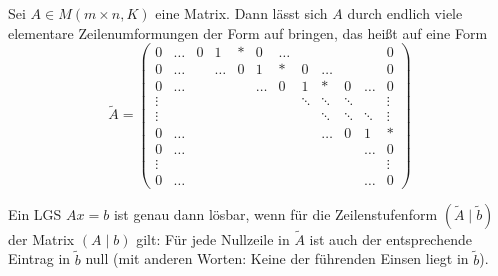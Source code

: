\setcounter{MaxMatrixCols}{20}
\setcounter{definition}{10}
\begin{satz}
	\label{satz:I.3.11}
	Sei $A \in M(m\times n,K)$ eine Matrix.
	Dann lässt sich $A$ durch endlich viele elementare Zeilenumformungen der Form auf  bringen, das heißt auf eine Form
	\[
		\tilde{A} = 
		\begin{pmatrix}
		0 & \dots & 0 & 1 & * & 0 & \dots &  &  &  &  & 0 \\ 
		0 & \dots &  & \dots & 0 & 1 & * & 0 & \dots &  &  & 0 \\ 
		0 & \dots &  &  &  & \dots & 0 & 1 & * & 0 & \dots & 0 \\ 
		\vdots &  &  &  &  &  &  & \ddots & \ddots & \ddots &  & \vdots \\ 
		\vdots &  &  &  &  &  &  &  & \ddots & \ddots & \ddots & \vdots \\ 
		0 & \dots &  &  &  &  &  &  & \dots & 0 & 1 & * \\ 
		0 & \dots &  &  &  &  &  &  &  &  & \dots & 0 \\ 
		\vdots &  &  &  &  &  &  &  &  &  &  & \vdots \\ 
		0 & \dots &  &  &  &  &  &  &  &  & \dots & 0
		\end{pmatrix}  
	\]
\end{satz}

\begin{satz}
	\label{satz:I.3.12}
	Ein LGS $Ax = b$ ist genau dann lösbar, wenn für die Zeilenstufenform $(\tilde{A} \mid \tilde{b})$ der Matrix $(A \mid b)$ gilt:
	Für jede Nullzeile in $\tilde{A}$ ist auch der entsprechende Eintrag in $\tilde{b}$ null (mit anderen Worten:
	Keine der führenden Einsen liegt in $\tilde{b}$).
\end{satz}